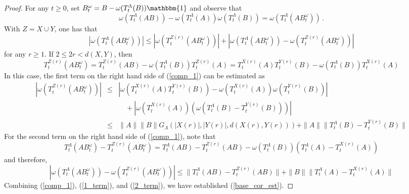 \documentclass{article}
\newcommand{\one}{\mathbbm{1}}
\newcommand{\<}{\langle}
\renewcommand{\>}{\rangle}
\numberwithin{equation}{section}
\theoremstyle{definition}
\begin{document}
\begin{proof} 
For any $t \geq 0$, set $B_t^{\omega} = B - \omega(T^{\Lambda}_t(B))\one$ and observe that
 \begin{equation}
 \omega(T_t^{\Lambda}(AB)) - \omega(T_t^{\Lambda}(A)) \omega(T_t^{\Lambda}(B)) = \omega(T_t^{\Lambda}(AB_t^{\omega})) \, .
 \end{equation}
 With $Z = X \cup Y$, one has that 
 \begin{equation} \label{comp_1}
 | \omega(T_t^{\Lambda}(AB_t^{\omega})) | \leq |\omega(T_t^{Z(r)}(AB_t^{\omega}))|  + |\omega(T_t^{\Lambda}(AB_t^{\omega})) - \omega(T_t^{Z(r)}(AB_t^{\omega})) |
 \end{equation}
 for any $r \geq 1$. If $2 \leq 2r < d(X,Y)$, then
 \begin{equation}
 T_t^{Z(r)}(AB_t^{\omega}) = T_t^{Z(r)}(AB) - \omega(T_t^{\Lambda}(B)) T_t^{Z(r)}(A) = T_t^{X(r)}(A) T_t^{Y(r)}(B) - \omega(T_t^{\Lambda}(B)) T_t^{X(r)}(A) 
 \end{equation} 
In this case, the first term on the right hand side of (\ref{comp_1}) can be estimated as
\begin{eqnarray} \label{1_term}
 |\omega(T_t^{Z(r)}(AB_t^{\omega}))| & \leq & \left| \omega(T_t^{X(r)}(A) T_t^{Y(r)}(B)) - \omega(T_t^{X(r)}(A)) \omega(T_t^{Y(r)}(B)) \right|   \nonumber \\
 & \mbox{ } & \quad +  \left| \omega(T_t^{X(r)}(A)) \left( \omega \left( T_t^{\Lambda}(B) - T_t^{Y(r)}(B) \right) \right) \right| \nonumber \\
 & \leq & \|A\| \| B \| G_{\Lambda}\left(|X(r)|, |Y(r)|, d(X(r), Y(r))\right) + \| A \| \| T_t^{\Lambda}(B) - T_t^{Y(r)}(B) \| 
\end{eqnarray}
For the second term on the right hand side of (\ref{comp_1}), note that
\begin{equation}
T_t^{\Lambda}(AB_t^{\omega}) - T_t^{Z(r)}(AB_t^{\omega}) = T_t^{\Lambda}(AB) - T_t^{Z(r)}(AB) - \omega(T_t^{\Lambda}(B)) \left( T_t^{\Lambda}(A) - T_t^{X(r)}(A) \right) 
\end{equation}
and therefore, 
\begin{equation} \label{2_term}
|\omega(T_t^{\Lambda}(AB_t^{\omega})) - \omega(T_t^{Z(r)}(AB_t^{\omega})) | \leq \| T_t^{\Lambda}(AB) - T_t^{Z(r)}(AB) \| + \| B \| \| T_t^{\Lambda}(A) - T_t^{X(r)}(A) \| 
\end{equation}
Combining (\ref{comp_1}), (\ref{1_term}), and (\ref{2_term}), we have established (\ref{base_cor_est}). 
\end{proof}
\end{document}
